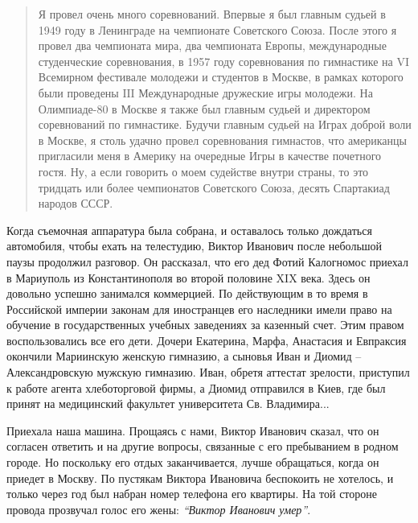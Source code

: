 \begin{quote}
{Я провел очень много соревнований. Впервые я был главным судьей в 1949 году в
Ленинграде на чемпионате Советского Союза. После этого я провел два чемпионата
мира, два чемпионата Европы, международные студенческие соревнования, в 1957
году соревнования по гимнастике на VΙ Всемирном фестивале молодежи и студентов
в Москве, в рамках которого были проведены ΙΙΙ Международные дружеские игры
молодежи. На Олимпиаде-80 в Москве я также был главным судьей и директором
соревнований по гимнастике. Будучи главным судьей на Играх доброй воли в
Москве, я столь удачно провел соревнования гимнастов, что американцы пригласили
меня в Америку на очередные Игры в качестве почетного гостя. Ну, а если
говорить о моем судействе внутри страны, то это тридцать или более чемпионатов
Советского Союза, десять Спартакиад народов СССР}.	
\end{quote}

Когда съемочная аппаратура была собрана, и оставалось только дождаться
автомобиля, чтобы ехать на телестудию, Виктор Иванович после небольшой паузы
продолжил разговор. Он рассказал, что его дед Фотий Калогномос приехал в
Мариуполь из Константинополя во второй половине ΧΙΧ века. Здесь он довольно
успешно занимался коммерцией. По действующим в то время в Российской империи
законам для иностранцев его наследники имели право на обучение в
государственных учебных заведениях за казенный счет. Этим правом
воспользовались все его дети. Дочери Екатерина, Марфа, Анастасия и Евпраксия
окончили Мариинскую женскую гимназию, а сыновья Иван и Диомид – Александровскую
мужскую гимназию. Иван, обретя аттестат зрелости, приступил к работе агента
хлеботорговой фирмы, а Диомид отправился в Киев, где был принят на медицинский
факультет университета Св. Владимира...

Приехала наша машина. Прощаясь с нами, Виктор Иванович сказал, что он согласен
ответить и на другие вопросы, связанные с его пребыванием в родном городе. Но
поскольку его отдых заканчивается, лучше обращаться, когда он приедет в Москву.
По пустякам Виктора Ивановича беспокоить не хотелось, и только через год был
набран номер телефона его квартиры. На той стороне провода прозвучал голос его
жены: \emph{\enquote{Виктор Иванович умер}}. 
